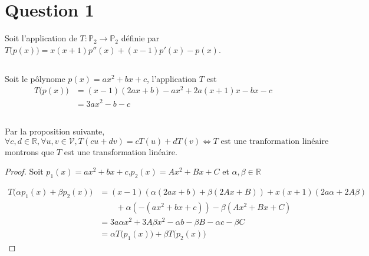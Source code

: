 \section*{Question 1}
Soit l'application de $T:\mathbb{P}_2\longrightarrow\mathbb{P}_2$ définie par $T\big(p(x)\big)=x(x+1)p''(x)+(x-1)p'(x)-p(x)$.
\subsection{}
Soit le pôlynome $p(x)=ax^2+bx+c$, l'application $T$ est
\[\begin{split} T\big(p(x)\big)&=(x-1) (2 a x+b)-a x^2+2 a (x+1) x-b x-c\\
 &=3 a x^2-b-c\end{split}\]
\subsection{}
Par la proposition suivante,
	\[\forall c,d\in\mathbb{R},\forall u,v\in\mathcal{V},T(cu+dv)=cT(u)+dT(v) \Longleftrightarrow T \text{ est une tranformation linéaire} \]
montrons que $T$ est une transformation linéaire.
\begin{proof}
	Soit $p_1(x)=ax^2+bx+c$,$p_2(x)=Ax^2+Bx+C$ et  $\alpha,\beta\in\mathbb{R}$

\[\begin{split}
T\big(\alpha p_1(x)+\beta p_2(x)\big)&=(x-1) (\alpha  (2 a x+b)+\beta  (2 A x+B))+x (x+1) (2 a \alpha +2 A \beta
)\\
&\qquad+\alpha  \left(-\left(a x^2+b x+c\right)\right)-\beta  \left(A x^2+B
x+C\right)\\
&=3 a \alpha  x^2+3 A \beta  x^2-\alpha  b-\beta  B-\alpha  c-\beta  C\\
&=\alpha T\big(p_1(x)\big) + \beta T\big(p_2(x)\big)
\end{split}\]
\end{proof}
